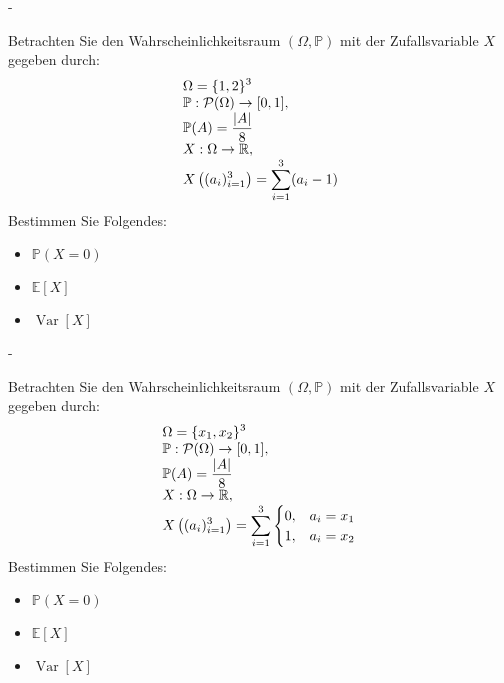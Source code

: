 \documentclass{article}
\begin{document}
\begin{solution}
-
\end{solution}

\newpage

\begin{problem}
Betrachten Sie den Wahrscheinlichkeitsraum $(\Omega, \mathbb{P})$ mit der Zufallsvariable $X$ gegeben durch:
\[
\begin{array}{>{\displaystyle}l}
\Omega = \{1, 2\}^3 \\
\mathbb{P}: \mathcal{P}(\Omega) \to [0, 1], \\
\mathbb{P}(A) = \frac{|A|}{8} \\
X: \Omega \to \mathbb{R}, \\
X \left( (a_i)_{i = 1}^3 \right) = \sum_{i = 1}^3 (a_i - 1)
\end{array}
\]
Bestimmen Sie Folgendes:
\begin{itemize}
\item $\mathbb{P}(X = 0)$
\item $\mathbb{E}[X]$
\item $\operatorname{Var}[X]$
\end{itemize}
\end{problem}

\begin{solution}
-
\end{solution}

\newpage

\begin{problem}
Betrachten Sie den Wahrscheinlichkeitsraum $(\Omega, \mathbb{P})$ mit der Zufallsvariable $X$ gegeben durch:
\[
\begin{array}{>{\displaystyle}l}
\Omega = \{x_1, x_2\}^3 \\
\mathbb{P}: \mathcal{P}(\Omega) \to [0, 1], \\
\mathbb{P}(A) = \frac{|A|}{8} \\
X: \Omega \to \mathbb{R}, \\
X \left( (a_i)_{i = 1}^3 \right) = \sum_{i = 1}^3 \begin{cases} 0, & a_i = x_1 \\ 1, & a_i = x_2 \\ \end{cases}
\end{array}
\]
Bestimmen Sie Folgendes:
\begin{itemize}
\item $\mathbb{P}(X = 0)$
\item $\mathbb{E}[X]$
\item $\operatorname{Var}[X]$
\end{itemize}
\end{problem}
\end{document}
